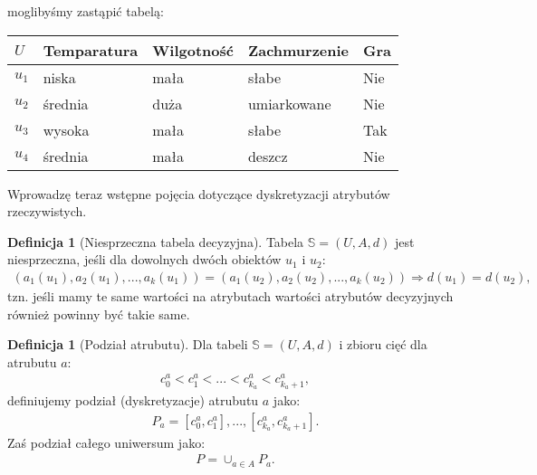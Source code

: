 \documentclass[magisterska]{pracamgr}
\theoremstyle{plain}
\theoremstyle{definition}
\newtheorem{definicja}[thm]{Definicja}
\theoremstyle{remark}
\begin{document}
moglibyśmy zastąpić tabelą:

\begin{center}
 \begin{tabular}{l || P{2.5cm} P{2.5cm} P{2.5cm} | P{1.5cm}}
  $U$     & Temparatura & Wilgotność & Zachmurzenie & Gra \\ 
  \hline
  $u_{1}$ & niska      & mała      & słabe          & Nie \\
  $u_{2}$ & średnia    & duża      & umiarkowane    & Nie \\
  $u_{3}$ & wysoka     & mała      & słabe   	    & Tak \\
  $u_{4}$ & średnia    & mała      & deszcz         & Nie \\
 \end{tabular}
\end{center}

\newpage
Wprowadzę teraz wstępne pojęcia dotyczące dyskretyzacji atrybutów rzeczywistych.


\begin{definicja}[Niesprzeczna tabela decyzyjna]
Tabela  $\mathbb{S} =(U, A, d)$  jest niesprzeczna, jeśli dla dowolnych dwóch obiektów $u_{1}$ i $u_{2}$:
  \begin{align*}
     (a_{1}(u_{1}), a_{2}(u_{1}), ..., a_{k}(u_{1})) = (a_{1}(u_{2}), a_{2}(u_{2}), ..., a_{k}(u_{2})) \Rightarrow 
     d(u_{1}) = d(u_{2}),
  \end{align*}
tzn. jeśli mamy te same wartości na atrybutach wartości atrybutów decyzyjnych również powinny być takie same.
\end{definicja}

\begin{definicja}[Podział atrubutu]
Dla tabeli  $\mathbb{S} =(U, A, d)$  i zbioru cięć dla atrubutu $a$:
\begin{align*}
     c_{0}^{a} < c_{1}^{a} < ... < c_{k_{a}}^{a} < c_{k_{a} + 1}^{a},
  \end{align*}
definiujemy podział (dyskretyzacje) atrubutu $a$ jako:
  \begin{align*}
     P_{a} = {[c_{0}^{a}, c_{1}^{a}], ... , [c_{k_{a}}^{a}, c_{k_{a} + 1}^{a}]}.
  \end{align*}
Zaś podział całego uniwersum jako:
  \begin{align*}
     P = \cup_{a \in A} P_{a}.
  \end{align*}
\end{definicja}
\end{document}

